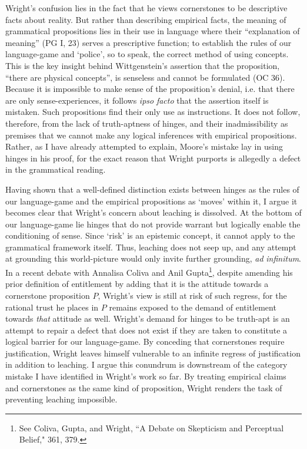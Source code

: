 Wright's confusion lies in the fact that he views cornerstones to be
descriptive facts about reality. But rather than describing empirical
facts, the meaning of grammatical propositions lies in their use in
language where their ``explanation of meaning'' (PG I, 23) serves a
prescriptive function; to establish the rules of our language-game and
`police', so to speak, the correct method of using concepts. This is the
key insight behind Wittgenstein's assertion that the proposition,
``there are physical concepts'', is senseless and cannot be formulated
(OC 36). Because it is impossible to make sense of the proposition's
denial, i.e. that there are only sense-experiences, it follows
\emph{ipso} \emph{facto} that the assertion itself is mistaken. Such
propositions find their only use as instructions. It does not follow,
therefore, from the lack of truth-aptness of hinges, and their
inadmissibility as premises that we cannot make any logical inferences
with empirical propositions. Rather, as I have already attempted to
explain, Moore's mistake lay in using hinges in his proof, for the exact
reason that Wright purports is allegedly a defect in the grammatical
reading.

Having shown that a well-defined distinction exists between hinges as
the rules of our language-game and the empirical propositions as `moves'
within it, I argue it becomes clear that Wright's concern about leaching
is dissolved. At the bottom of our language-game lie hinges that do not
provide warrant but logically enable the conditioning of sense. Since
`risk' is an epistemic concept, it cannot apply to the grammatical
framework itself. Thus, leaching does not seep up, and any attempt at
grounding this world-picture would only invite further grounding,
\emph{ad} \emph{infinitum}. In a recent debate with Annalisa Coliva and
Anil Gupta\footnote{See Coliva, Gupta, and Wright, ``A Debate on
  Skepticism and Perceptual Belief," 361, 379.}, despite amending his
prior definition of entitlement by adding that it is the attitude
towards a cornerstone proposition $P$, Wright's view is still at risk of
such regress, for the rational trust he places in $P$ remains exposed to
the demand of entitlement towards \emph{that} attitude as well. Wright's
demand for hinges to be truth-apt is an attempt to repair a defect that
does not exist if they are taken to constitute a logical barrier for our
language-game. By conceding that cornerstones require justification,
Wright leaves himself vulnerable to an infinite regress of justification
in addition to leaching. I argue this conundrum is downstream of the
category mistake I have identified in Wright's work so far. By treating
empirical claims and cornerstones as the same kind of proposition,
Wright renders the task of preventing leaching impossible.


